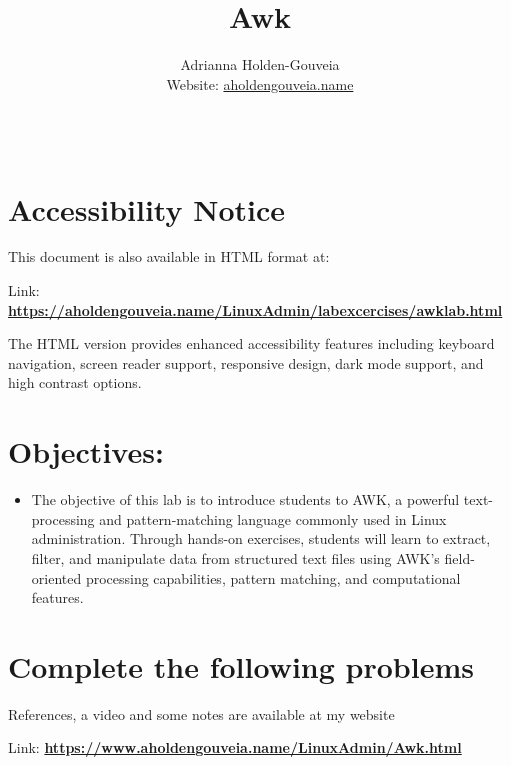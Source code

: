 \documentclass[12pt]{article}
\title{Awk}
\author{
        Adrianna Holden-Gouveia \\
        Website: \href{https://aholdengouveia.name}{aholdengouveia.name}\\ 
        \date{\vspace{-5ex}}
        \faGithub {: aholdengouveia} \\
        }
\begin{document}
    

\maketitle


\section*{Accessibility Notice}
This document is also available in HTML format at:

Link: \href{https://aholdengouveia.name/LinuxAdmin/labexcercises/awklab.html}{\textbf{https://aholdengouveia.name/LinuxAdmin/labexcercises/awklab.html}}

The HTML version provides enhanced accessibility features including keyboard navigation, screen reader support, responsive design, dark mode support, and high contrast options.

\section*{Objectives:}
\begin{itemize}
    \item The objective of this lab is to introduce students to AWK, a powerful text-processing and pattern-matching language commonly used in Linux administration. Through hands-on exercises, students will learn to extract, filter, and manipulate data from structured text files using AWK's field-oriented processing capabilities, pattern matching, and computational features.
\end{itemize}
\section*{Complete the following problems}

References, a video and some notes are available at my website

Link: \href{https://www.aholdengouveia.name/LinuxAdmin/Awk.html}{\textbf{https://www.aholdengouveia.name/LinuxAdmin/Awk.html}}
\end{document}
